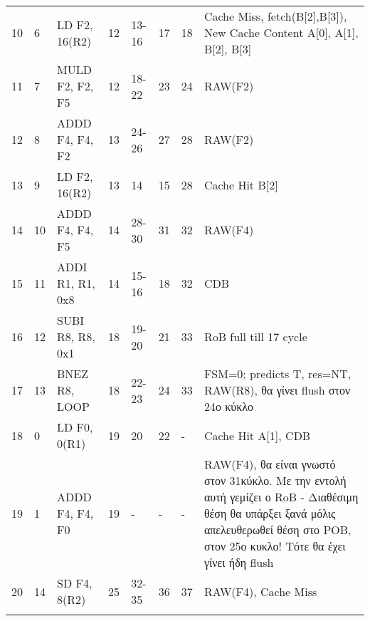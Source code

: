 \begin{table}
\begin{tabular}{|l|p{0.8cm}|l|l|l|l|l|p{6.2cm}|}
      10 & 6 & LD F2, 16(R2) & 12 & 13-16 & 17 & 18 & Cache Miss, fetch(B[2],B[3]), New Cache Content A[0], A[1], B[2], B[3] \\ \Xhline{3\arrayrulewidth}
      11 & 7 & MULD F2, F2, F5 & 12 & 18-22 & 23 & 24 & RAW(F2) \\ \Xhline{3\arrayrulewidth}
      12 & 8 & ADDD F4, F4, F2 & 13 & 24-26 & 27 & 28 & RAW(F2) \\ \Xhline{3\arrayrulewidth}
      13 & 9 & LD F2, 16(R2) & 13 & 14 & 15 & 28 & Cache Hit B[2] \\ \Xhline{3\arrayrulewidth}
      14 & 10 & ADDD F4, F4, F5 & 14 & 28-30 & 31 & 32 & RAW(F4) \\ \Xhline{3\arrayrulewidth}
      15 & 11 & ADDI R1, R1, 0x8 & 14 & 15-16 & 18 & 32 & CDB \\ \Xhline{3\arrayrulewidth}
      16 & 12 & SUBI R8, R8, 0x1 & 18 & 19-20 & 21 & 33 & RoB full till 17 cycle \\ \Xhline{3\arrayrulewidth}
      17 & 13 & BNEZ R8, LOOP & 18 & 22-23 & 24 & 33 & FSM=0; predicts T, res=NT, RAW(R8), θα γίνει flush στον 24ο κύκλο \\ \Xhline{3\arrayrulewidth}
      \rowcolor{yellow}
      18 & 0 & LD F0, 0(R1) & 19 & 20 & 22 & - & Cache Hit A[1], CDB \\ \Xhline{3\arrayrulewidth}
      \rowcolor{yellow}
      19 & 1 & ADDD F4, F4, F0 & 19 & - & - & - & RAW(F4), θα είναι γνωστό στον 31κύκλο. Με την εντολή αυτή γεμίζει ο RoB - Διαθέσιμη θέση θα υπάρξει ξανά μόλις απελευθερωθεί θέση στο ΡΟΒ, στον 25ο κυκλο! Τότε θα έχει γίνει ήδη flush \\ \Xhline{3\arrayrulewidth}
      20 & 14 & SD F4, 8(R2) & 25 & 32-35 & 36 & 37 & RAW(F4), Cache Miss \\ \Xhline{3\arrayrulewidth}
  \end{tabular}
\end{table}